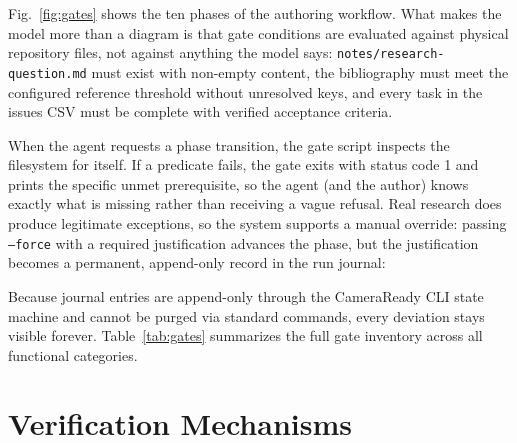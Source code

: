 \documentclass[conference]{IEEEtran}
\begin{document}
Fig.~\ref{fig:gates} shows the ten phases of the authoring workflow. What makes the model more than a diagram is that gate conditions are evaluated against physical repository files, not against anything the model says: \texttt{notes/research-question.md} must exist with non-empty content, the bibliography must meet the configured reference threshold without unresolved keys, and every task in the issues CSV must be complete with verified acceptance criteria.

When the agent requests a phase transition, the gate script inspects the filesystem for itself. If a predicate fails, the gate exits with status code 1 and prints the specific unmet prerequisite, so the agent (and the author) knows exactly what is missing rather than receiving a vague refusal. Real research does produce legitimate exceptions, so the system supports a manual override: passing \texttt{--force} with a required justification advances the phase, but the justification becomes a permanent, append-only record in the run journal:

\begin{center}
\vspace{-3pt}
\vspace{-3pt}
\end{center}

Because journal entries are append-only through the CameraReady CLI state machine and cannot be purged via standard commands, every deviation stays visible forever. Table~\ref{tab:gates} summarizes the full gate inventory across all functional categories.

\section{Verification Mechanisms}
\label{sec:verify}
\end{document}

